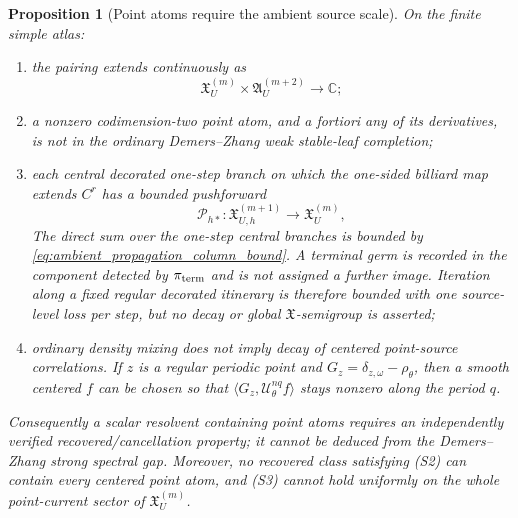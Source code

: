 \documentclass[11pt]{amsart}
\theoremstyle{compactplain}
\newtheorem{proposition}[theorem]{Proposition}
\theoremstyle{compactdefinition}
\theoremstyle{compactremark}
\begin{document}
\begin{proposition}[Point atoms require the ambient source scale]
\label{prop:point_atoms_ambient_not_dz_weak}
On the finite simple atlas:
\begin{enumerate}[label=\textup{(\roman*)},wide,labelindent=0pt]
  \item the pairing extends continuously as
  \[
    \mathfrak X_U^{(m)}\times\mathfrak A_U^{(m+2)}\longrightarrow\mathbb C;
  \]
  \item a nonzero codimension-two point atom, and a fortiori any of its
  derivatives, is not in the ordinary Demers--Zhang weak stable-leaf
  completion;
  \item each central decorated one-step branch on which the one-sided billiard
  map extends \(C^r\) has a bounded pushforward
  \begin{equation}
  \label{eq:ambient_central_pushforward}
    \mathscr P_{h*}:\mathfrak X_{U,h}^{(m+1)}
       \longrightarrow\mathfrak X_U^{(m)},
  \end{equation}
  The direct sum over the one-step central branches is bounded by
  \eqref{eq:ambient_propagation_column_bound}.  A terminal germ is recorded in
  the component detected by \(\pi_{\rm term}\) and is not assigned a further
  image.  Iteration along a
  fixed regular decorated itinerary is therefore bounded with one source-level
  loss per step, but no decay or global \(\mathfrak X\)-semigroup is asserted;
  \item ordinary density mixing does not imply decay of centered point-source
  correlations.  If \(z\) is a regular periodic point and
  \(G_z=\delta_{z,\omega}-\rho_\theta\), then a smooth centered \(f\) can be
  chosen so that \(\langle G_z,\mathscr U_\theta^{nq}f\rangle\) stays nonzero
  along the period \(q\).
\end{enumerate}
Consequently a scalar resolvent containing point atoms requires an independently
verified recovered/cancellation property; it cannot be deduced from the
Demers--Zhang strong spectral gap.  Moreover, no recovered class satisfying
(S2) can contain every centered point atom, and (S3) cannot hold uniformly on
the whole point-current sector of \(\mathfrak X_U^{(m)}\).
\end{proposition}
\end{document}
